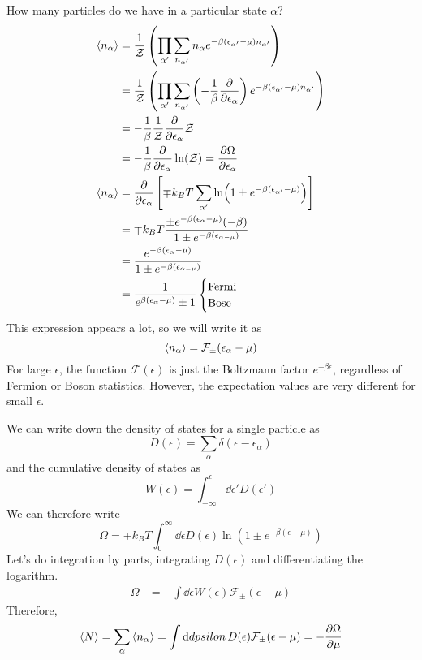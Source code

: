 \documentclass[a4paper,twoside,master.tex]{subfiles}
\begin{document}
How many particles do we have in a particular state $ \alpha $?
\begin{align}
    \ev{n_{\alpha}} &= \frac{1}{\mathcal{Z}} \left( \prod_{\alpha'} \sum_{n_{\alpha'}} n_{\alpha} e^{- \beta (\epsilon_{\alpha'} - \mu)n_{\alpha'}} \right) \\
    &= \frac{1}{\mathcal{Z}} \left( \prod_{\alpha'} \sum_{n_{\alpha'}} \left( - \frac{1}{\beta} \pdv{\epsilon_{\alpha}} \right) e^{- \beta (\epsilon_{\alpha'} - \mu)n_{\alpha'}} \right) \\
    &= - \frac{1}{\beta} \frac{1}{\mathcal{Z}} \pdv{\epsilon_{\alpha}} \mathcal{Z} \\
    &= - \frac{1}{\beta} \pdv{\epsilon_{\alpha}} \ln(\mathcal{Z}) = \pdv{\Omega}{\epsilon_{\alpha}} \\
    \ev{n_{\alpha}} &= \pdv{\epsilon_{\alpha}}\left[ \mp k_B T \sum_{\alpha'} \ln(1 \pm e^{- \beta (\epsilon_{\alpha'} - \mu)}) \right] \\
    &= \mp k_B T \frac{\pm e^{- \beta (\epsilon_{\alpha} - \mu)} (- \beta)}{1 \pm e^{- \beta (\epsilon_{\alpha - \mu})}} \\
    &= \frac{e^{- \beta (\epsilon_{\alpha} - \mu)}}{1 \pm e^{- \beta (\epsilon_{\alpha - \mu})}} \\
    &= \frac{1}{e^{\beta (\epsilon_{\alpha} - \mu)} \pm 1} \begin{cases} \text{Fermi} \\ \text{Bose} \end{cases}
\end{align}
This expression appears a lot, so we will write it as
\begin{equation}
    \ev{n_{\alpha}} = \mathcal{F}_{\pm}(\epsilon_{\alpha} - \mu)
\end{equation}
For large $ \epsilon $, the function $ \mathcal{F}(\epsilon) $ is just the Boltzmann factor $ e^{- \beta \epsilon} $, regardless of Fermion or Boson statistics. However, the expectation values are very different for small $ \epsilon $.


We can write down the density of states for a single particle as
\begin{equation}
    D(\epsilon) = \sum_{\alpha} \delta(\epsilon - \epsilon_{\alpha})
\end{equation}
and the cumulative density of states as
\begin{equation}
    W(\epsilon) = \int_{- \infty}^{\epsilon} \dd{\epsilon'} D(\epsilon')
\end{equation}
We can therefore write
\begin{equation}
    \Omega = \mp k_B T \int_{0}^{\infty} \dd{\epsilon} D(\epsilon) \ln(1 \pm e^{- \beta (\epsilon - \mu)})
\end{equation}
Let's do integration by parts, integrating $ D(\epsilon) $ and differentiating the logarithm.
\begin{align}
    \Omega &= - \int \dd{\epsilon} W(\epsilon) \mathcal{F}_{\pm}(\epsilon - \mu)
\end{align}
Therefore,
\begin{equation}
    \ev{N} = \sum_{\alpha} \ev{n_{\alpha}} = \int \dd{dpsilon} D(\epsilon) \mathcal{F}_{\pm}(\epsilon - \mu) = - \pdv{\Omega}{\mu}
\end{equation}
\end{document}
